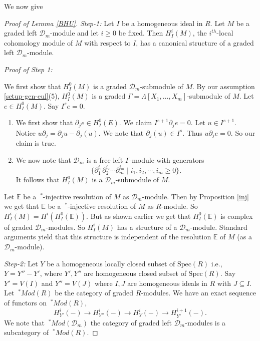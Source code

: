 \documentclass{amsart}
\newcommand{\D}{\mathcal{D} }
\theoremstyle{plain}
\theoremstyle{definition}
\theoremstyle{remark}
\begin{document}
\s We now give
\begin{proof}[Proof of Lemma \ref{BHU}] 

\emph{Step-1:}  Let $I$ be a homogeneous ideal in $R$. Let $M$ be a graded left $\D_m$-module and let $i \geq 0$ be fixed.
Then $H^i_I(M)$, the $i^{th}$-local
cohomology module of $M$ with respect to $I$, has a 
canonical structure
of a graded left $\D_m$-module.

\textit{Proof of Step 1:} 

We first show that $H^0_I(M)$ is a graded $\D_m$-submodule of $M$.
By our assumption \ref{setup-gen-eul}(5), $H^0_I(M)$ is a graded $\Gamma = \Lambda[X_1,\ldots, X_m]$-submodule of $M$.
Let $e \in H^0_I(M)$. Say $I^s e = 0$.
 \begin{enumerate}
  \item We first show that $\partial_j e \in H^0_I(E)$. We claim $I^{s+1}\partial_j e = 0$. Let $u \in I^{s+1}$. Notice
  $u \partial_j = \partial_j u - \partial_j(u)$. We note that $\partial_j(u) \in I^s$. Thus $u \partial_j e = 0$. So
  our claim is true.
  \item
  We now note that $\D_m$ is a free left $\Gamma$-module with generators 
  $$\{ \partial_1^{i_1} \partial_2^{i_2} \cdots \partial_m^{i_m} \mid i_1,i_2, \cdots, i_m \geq 0 \}.$$
  It follows that $H^0_I(M)$ is a $\D_m$-submodule of $M$.
 \end{enumerate}


Let $\mathbb{E}$ be a $ \ ^*$-injective resolution of $M$ as $\D_m$-module. Then by Proposition \ref{inj}
 we get that $\mathbb{E}$ be a $ \ ^*$-injective resolution of $M$ as $R$-module.
 So $H^i_I(M) = H^i(H^0_I(\mathbb{E}))$. But as shown earlier  we get that
 $H^0_I(\mathbb{E})$ is complex of graded $\D_m$-modules. So $H^i_I(M)$ has a structure of a $\D_m$-module. Standard arguments
 yield that this structure is independent of the resolution $\mathbb{E}$ of $M$ (as a $\D_m$-module).
 
 \emph{Step-2:} 
 Let $Y$ be a homogeneous locally closed subset of $\text{Spec}(R)$ i.e., $Y=Y''-Y'$, where $Y', Y''$ 
are homogeneous closed subset of $\text{Spec}(R)$.  Say $Y' = V(I)$ and $Y'' = V(J)$ where $I, J$ are homogeneous ideals in $R$
 with $J \subseteq I$. Let $\ ^*Mod(R)$ be the category of graded $R$-modules. 
We have an exact sequence of  functors on $\ ^*Mod(R)$,
\begin{equation}\label{eq1-2} H_{Y'}^i(-) \longrightarrow H_{Y''}^i(-) \longrightarrow H_{Y}^i(-) \longrightarrow 
H_{Y'}^{i+1}(-).
\end{equation}
We note that $\ ^* Mod(\D_m)$ the category of graded left $\D_m$-modules is a subcategory of  $\ ^*Mod(R)$. 


\end{proof}
\end{document}
